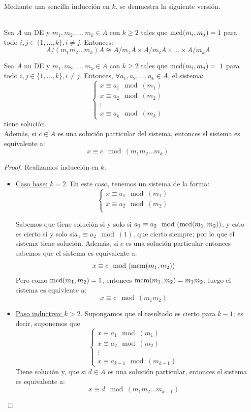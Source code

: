 Mediante una sencilla inducción en $k$, se demuestra la siguiente versión.
\begin{teo}
    \ \\
    Sea $A$ un DE y $m_1, m_2, \ldots, m_k \in A$ con $k \geq 2$ tales que $\operatorname{mcd}(m_i, m_j)=1$ para todo $i,j \in \{1, \ldots, k\}, i\neq j$. Entonces:
    $$A/(m_1m_2\ldots m_k)A \cong A/m_1A \times A/m_2A \times \ldots \times A/m_kA$$
\end{teo}

\begin{lema} Sea $A$ un DE y $m_1, m_2, \ldots, m_k \in A$ con $k \geq 2$ tales que $\operatorname{mcd}(m_i, m_j)=~1$ para todo $i,j \in \{1, \ldots, k\}, i\neq j$. Entonces, $\forall a_1, a_2, \ldots, a_k \in A$, el sistema:
    $$\left\{ \begin{array}{l}
            x\equiv a_1\mod(m_1) \\
            x\equiv a_2\mod(m_2) \\
            \vdots               \\
            x\equiv a_k\mod(m_k)
        \end{array} \right.$$
    tiene solución.\\

    
    Además, si $c \in A$ es una solución particular del sistema, entonces sl sistema es equivalente a:
    $$x\equiv c\mod(m_1m_2\ldots m_k)$$
\begin{proof}
    Realizamos inducción en $k$.
\begin{itemize}
    \item \ul{Caso base: $k=2$}. En este caso, tenemos un sistema de la forma:
    $$\left\{ \begin{array}{l}
            x\equiv a_1\mod(m_1) \\
            x\equiv a_2\mod(m_2) \\
        \end{array} \right.$$
    
    Sabemos que tiene solución si y solo si $a_1\equiv a_2\mod(\operatorname{mcd}(m_1,m_2))$, y esto es cierto si y solo si$a_1\equiv a_2\mod(1)$, que cierto siempre; por lo que el sistema tiene solución. Además, si $c$ es una solución particular entonces sabemos que el sistema es equivalente a:
    $$x\equiv c\mod(\operatorname{mcm}(m_1,m_2))$$
    Pero como $\operatorname{mcd}(m_1,m_2)=1$, entonces $\operatorname{mcm}(m_1,m_2) = m_1m_2$, luego el sistema es equivlente a:
    $$x\equiv c\mod(m_1m_2)$$


    \item \ul{Paso inductivo: $k>2$}. Supongamos que el resultado es cierto para $k-1$; es decir, suponemos que
    $$\left\{ \begin{array}{l}
            x\equiv a_1\mod(m_1) \\
            x\equiv a_2\mod(m_2) \\
            \vdots               \\
            x\equiv a_{k-1}\mod(m_{k-1})
        \end{array} \right.$$
    Tiene solución y, que si $d\in A$ es una solución particular, entonces el sistema es equivalente a:
    $$x\equiv d\mod(m_1m_2\ldots m_{k-1})$$


\end{itemize}
\end{proof}
\end{lema}
